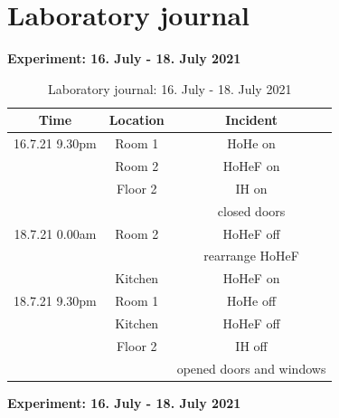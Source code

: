 \section{Laboratory journal}
\label{sec:appendix:Laborbuch}
\textbf{Experiment: 16. July - 18. July 2021}
\begin{table}[H]
    \centering
    \begin{tabular}{c|c|c}
        \textbf{Time} & \textbf{Location} & \textbf{Incident }\\
        \hline
        \hline
        16.7.21 9.30pm & Room 1 & HoHe on\\
        & Room 2 & HoHeF on\\
        & Floor 2 & IH on\\
        && closed doors\\
        \hline
        18.7.21 0.00am & Room 2 & HoHeF off\\ 
        && rearrange HoHeF \\
        & Kitchen & HoHeF on\\
        \hline
        18.7.21 9.30pm & Room 1 & HoHe off\\
        & Kitchen & HoHeF off\\
        & Floor 2 & IH off\\
        && opened doors and windows\\
    \end{tabular}
    \caption{Laboratory journal: 16. July - 18. July 2021}
    \label{tab:Experiment1app}
\end{table}
\textbf{Experiment: 16. July - 18. July 2021}

